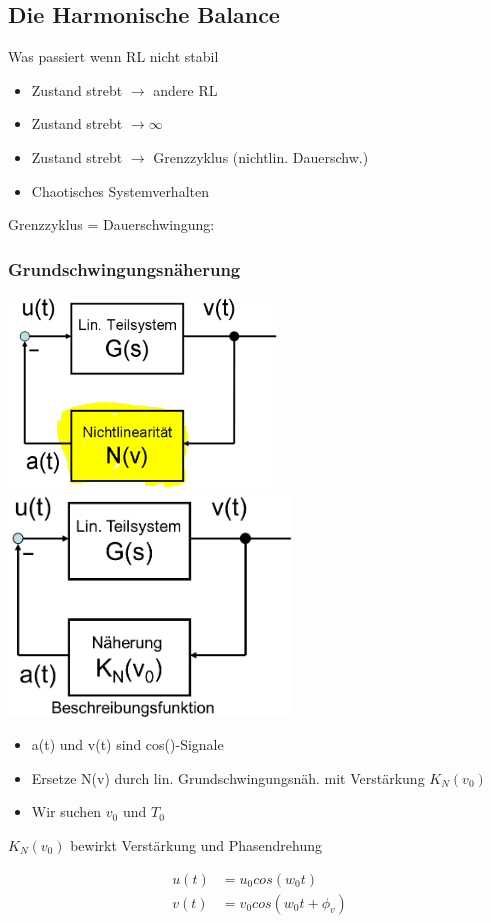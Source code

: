 \documentclass[10pt,a4paper]{article}
\begin{document}
  \newpage
  \subsection{Die Harmonische Balance}
  Was passiert wenn RL nicht stabil
  \begin{itemize}
    \item Zustand strebt $\rightarrow$ andere RL
    \item Zustand strebt $\rightarrow \infty$
    \item Zustand strebt $\rightarrow$ Grenzzyklus (nichtlin. Dauerschw.)
    \item Chaotisches Systemverhalten
  \end{itemize}
  Grenzzyklus = Dauerschwingung:

  \subsubsection{Grundschwingungsnäherung}

  \begin{center}
      \includegraphics[width=.22\textwidth]{./img/harm1.png}
      \includegraphics[width=.2\textwidth]{./img/harm2.png}
  \end{center}
  \begin{itemize}
      \item a(t) und v(t) sind cos()-Signale
      \item Ersetze N(v) durch lin. Grundschwingungsnäh. mit Verstärkung $K_N(v_0)$
      \item Wir suchen $v_0$ und $T_0$
  \end{itemize}
  $K_N(v_0)$ bewirkt Verstärkung und Phasendrehung 
  \begin{mdframed}[style=exercise]
    \begin{align}
        u(t) &= u_0 cos (w_0 t) \\
        v(t) &= v_0 cos (w_0 t + \phi_v)
    \end{align}
  \end{mdframed}
\end{document}
